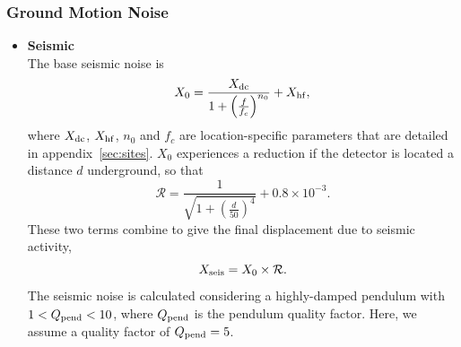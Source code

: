 \documentclass{article}
\begin{document}
\subsubsection*{Ground Motion Noise}
    \begin{itemize}
    \item \textbf{Seismic} \\
   The base seismic noise is
    \begin{equation}
    \label{eqn::baseseismic}
    X_0 = \frac{X_{\rm dc}}{1 + \left(\frac{f}{f_c}\right)^{n_0}} + X_{\rm hf},
    \end{equation}
    where $X_{\rm dc}$, $X_{\rm hf}$, $n_0$ and $f_c$ are location-specific
    parameters that are detailed in appendix~\ref{sec:sites}. $X_0$
    experiences a reduction if the detector is located a distance $d$
    underground, so that
    \begin{equation}
    \mathcal{R} = \frac{1}{\sqrt{1 + \left(\frac{d}{50}\right)^4}} + 0.8\times10^{-3} .
    \end{equation}
    These two terms combine to give the final displacement due to seismic activity,
    \begin{equation}
        X_{\rm seis} = X_0 \times \mathcal{R}.
    \label{eq:Xseis}
    \end{equation}
    The seismic noise is calculated considering a highly-damped
    pendulum with $1 < Q_{\rm pend} < 10$, where $Q_{\rm pend}$ is the
    pendulum quality factor. Here, we assume a quality factor of
    $Q_{\rm pend} = 5$. 
    

\end{itemize}
\end{document}
